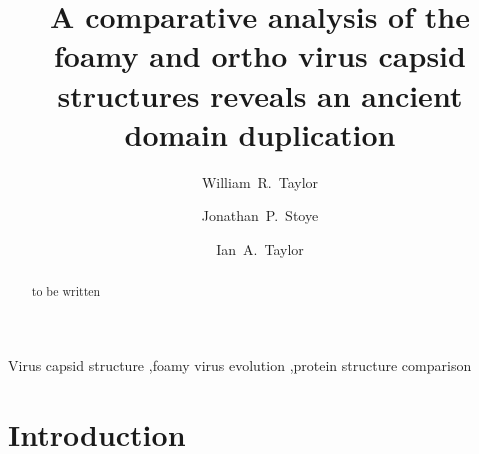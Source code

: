 \documentclass[preprint,12pt]{elsarticle}
\begin{document}
\begin{frontmatter}



\title{A comparative analysis of the foamy and ortho virus capsid structures
           reveals an ancient domain duplication}

\author[label1]{William~R.~Taylor}
\author[label2]{Jonathan~P.~Stoye}
\author[label3]{Ian~A.~Taylor}
\address[label1]{Computational Cell and Molecular Biology,}
\address[label2]{Retrovirus-Host Interactions,}
\address[label3]{Molecular Structure Laboratories,}
\address{Francis Crick Institute, 1 Midland Rd., London NW1 1AT, UK}


\begin{abstract}
to be written
\end{abstract}

\begin{keyword}
Virus capsid structure \sep foamy virus evolution \sep protein structure comparison


\end{keyword}

\end{frontmatter}

\linenumbers

\section{Introduction}
\end{document}
